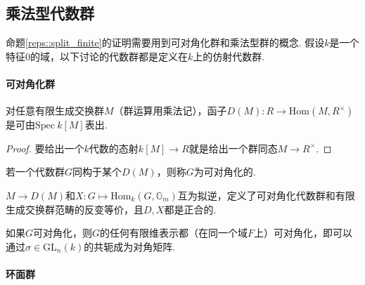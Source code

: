 \subsection{乘法型代数群}

命题\ref{reps::split_finite}的证明需要用到可对角化群和乘法型群的概念.
假设$k$是一个特征$0$的域，以下讨论的代数群都是定义在$k$上的仿射代数群.

\paragraph*{可对角化群}

\begin{cprop}
    对任意有限生成交换群$M$（群运算用乘法记），函子$D(M): R\to \mathrm{Hom}(M, R^{\times})$是可由$\mathrm{Spec}\ k[M]$表出.
\end{cprop}

\begin{proof}
    要给出一个$k$代数的态射$k[M]\to R$就是给出一个群同态$M\to R^{\times}$.
\end{proof}

\begin{cdef}
    若一个代数群$G$同构于某个$D(M)$，则称$G$为可对角化的.
\end{cdef}

\begin{cprop}
    $M\to D(M)$和$X: G\mapsto \mathrm{Hom}_k(G, \mathbb{G}_m)$互为拟逆，定义了可对角化代数群和有限生成交换群范畴的反变等价，且$D,X$都是正合的.
\end{cprop}


\begin{cprop}
    如果$G$可对角化，则$G$的任何有限维表示都（在同一个域$F$上）可对角化，即可以通过$\sigma\in\mathrm{GL}_n(k)$的共轭成为对角矩阵.
\end{cprop}


\paragraph*{环面群}

